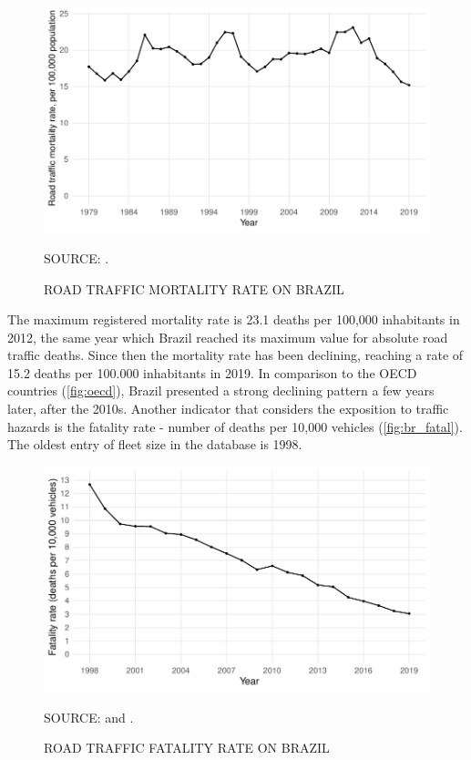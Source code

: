 
\begin{figure}[!htbp]
    \centering\footnotesize
    \captionsetup{font=footnotesize}
    \caption{ROAD TRAFFIC MORTALITY RATE ON BRAZIL}
    \includegraphics{fig/brazil_mort.pdf}
    \label{fig:br_mort}
    \par SOURCE: \textcite{MinistryofHealth2020}.
\end{figure}

The maximum registered mortality rate is 23.1 deaths per 100,000 inhabitants in 2012, the same year which Brazil reached its maximum value for absolute road traffic deaths. Since then the mortality rate has been declining, reaching a rate of 15.2 deaths per 100.000 inhabitants in 2019. In comparison to the OECD countries (\autoref{fig:oecd}), Brazil presented a strong declining pattern a few years later, after the 2010s. Another indicator that considers the exposition to traffic hazards is the fatality rate - number of deaths per 10,000 vehicles (\autoref{fig:br_fatal}). The oldest entry of fleet size in the \textcite{DENATRAN2020} database is 1998.

\begin{figure}[!htbp]
    \centering\footnotesize
    \captionsetup{font=footnotesize}
    \caption{ROAD TRAFFIC FATALITY RATE ON BRAZIL}
    \includegraphics{fig/brazil_fatality.pdf}
    \label{fig:br_fatal}
    \par SOURCE: \textcite{MinistryofHealth2020} and \textcite{DENATRAN2020}.
\end{figure}                                

